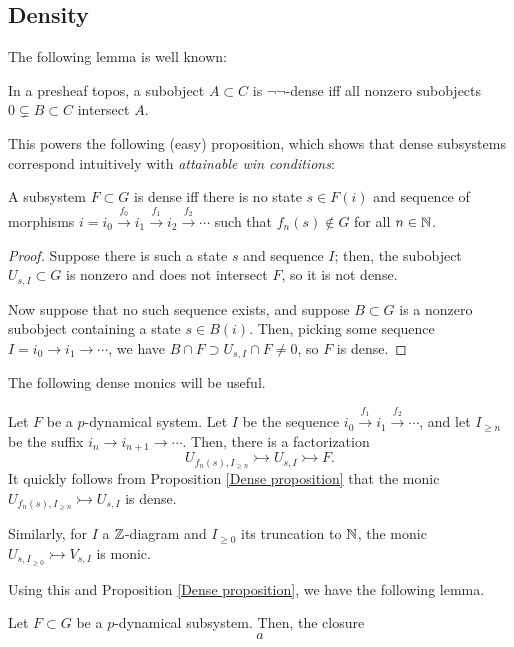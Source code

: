 \documentclass{amsart}
\begin{document}
\subsection{Density}
The following lemma is well known:
\begin{lemma}
  In a presheaf topos, a subobject $A \subset C$ is $\neg\neg$-dense iff all nonzero subobjects $0 \subsetneq B \subset C$ intersect $A$.
\end{lemma}
This powers the following (easy) proposition, which shows that dense subsystems correspond intuitively with \emph{attainable win conditions}:
\begin{proposition}\label{Dense proposition}
  A subsystem $F \subset G$ is dense iff there is no state $s \in F(i)$ and sequence of morphisms $i = i_0 \xrightarrow{f_0} i_1 \xrightarrow{f_1} i_2 \xrightarrow{f_2} \cdots$ such that $f_n(s) \not \in G$ for all $n \in \mathbb{N}$. 
\end{proposition}
\begin{proof}
  Suppose there is such a state $s$ and sequence $I$;
  then, the subobject $U_{s,I} \subset G$ is nonzero and does not intersect $F$, so it is not dense.

  Now suppose that no such sequence exists, and suppose $B \subset G$ is a nonzero subobject containing a state $s \in B(i)$.
  Then, picking some sequence $I = i_0 \rightarrow i_1 \rightarrow \cdots$, we have $B \cap F \supset U_{s,I} \cap F \neq 0$, so $F$ is dense.
\end{proof}

The following dense monics will be useful.
\begin{example}
  Let $F$ be a $p$-dynamical system.
  Let $I$ be the sequence $i_0 \xrightarrow{f_1} i_1 \xrightarrow{f_2} \cdots$, and let $I_{\geq n}$ be the suffix $i_n \rightarrow i_{n+1} \rightarrow \cdots$.
  Then, there is a factorization
  \[
      U_{f_n(s),I_{\geq n}} \rightarrowtail U_{s,I} \rightarrowtail F.
  \]
  It quickly follows from Proposition \ref{Dense proposition} that the monic $U_{f_n(s),I_{\geq n}} \rightarrowtail U_{s,I}$ is dense.

  Similarly, for $I$ a $\mathbb{Z}$-diagram and $I_{\geq 0}$ its truncation to $\mathbb{N}$, the monic $U_{s,I_{\geq 0}} \rightarrowtail V_{s,I}$ is monic.
\end{example}

Using this and Proposition \ref{Dense proposition}, we have the following lemma.
\begin{lemma}
  Let $F \subset G$ be a $p$-dynamical subsystem.
  Then, the closure 
  \[
    a
  \]
\end{lemma}
\end{document}
